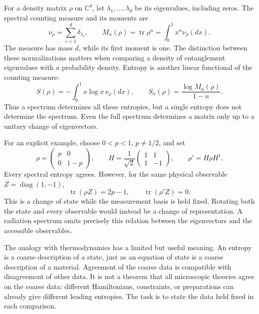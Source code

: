 \documentclass[11pt,letterpaper]{article}
\theoremstyle{plain}
\theoremstyle{definition}
\theoremstyle{remark}
\DeclareMathOperator{\tr}{tr}
\begin{document}
For a density matrix $\rho$ on $\mathbb C^d$, let
$\lambda_1,\ldots,\lambda_d$ be its eigenvalues, including zeros.
The spectral counting measure and its moments are
\begin{equation}
 \nu_\rho=\sum_{i=1}^d\delta_{\lambda_i},\qquad
 M_n(\rho)=\tr\rho^n=\int_0^1 x^n\nu_\rho(dx).
 \label{eq11:spectral_measure}
\end{equation}
The measure has mass $d$, while its first moment is one. The distinction
between these normalizations matters when comparing a density of
entanglement eigenvalues with a probability density. Entropy is another
linear functional of the counting measure:
\begin{equation}
 S(\rho)=-\int_0^1 x\log x\,\nu_\rho(dx),\qquad
 S_n(\rho)=\frac{\log M_n(\rho)}{1-n}.
 \label{eq11:renyi}
\end{equation}
Thus a spectrum determines all these entropies, but a single entropy
does not determine the spectrum. Even the full spectrum determines a
matrix only up to a unitary change of eigenvectors.

For an explicit example, choose $0<p<1$, $p\ne1/2$, and set
\begin{equation}
 \rho=\begin{pmatrix}p&0\\0&1-p\end{pmatrix},\qquad
 H=\frac1{\sqrt2}\begin{pmatrix}1&1\\1&-1\end{pmatrix},\qquad
 \rho'=H\rho H^\dagger.
 \label{eq11:isospectral_states}
\end{equation}
Every spectral entropy agrees. However, for the same physical observable
$Z=\operatorname{diag}(1,-1)$,
\begin{equation}
 \tr(\rho Z)=2p-1,\qquad \tr(\rho'Z)=0.
 \label{eq11:isospectral_observable}
\end{equation}
This is a change of state while the measurement basis is held fixed.
Rotating both the state and every observable would instead be a change
of representation. A radiation spectrum omits precisely this relation
between the eigenvectors and the accessible observables.

The analogy with thermodynamics has a limited but useful meaning. An
entropy is a coarse description of a state, just as an equation of state
is a coarse description of a material. Agreement of the coarse data is
compatible with disagreement of other data. It is not a theorem that
all microscopic theories agree on the coarse data: different Hamiltonians,
constraints, or preparations can already give different leading entropies.
The task is to state the data held fixed in each comparison.
\end{document}
